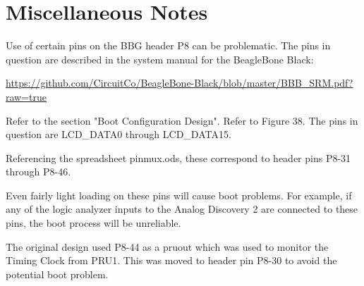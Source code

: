 \chapter{Miscellaneous Notes}

Use of certain pins on the BBG header P8 can be problematic.  The pins in question are described in the system manual for the BeagleBone Black:

\url{https://github.com/CircuitCo/BeagleBone-Black/blob/master/BBB_SRM.pdf?raw=true}

Refer to the section "Boot Configuration Design".  Refer to Figure 38.  The pins in question are LCD\_DATA0 through LCD\_DATA15.

Referencing the spreadsheet pinmux.ods, these correspond to header pins P8-31 through P8-46.

Even fairly light loading on these pins will cause boot problems.  For example, if any of the logic analyzer inputs to the Analog Discovery 2 are connected to these pins, the boot process will be unreliable.

The original design used P8-44 as a pruout which was used to monitor the Timing Clock from PRU1.  This was moved to header pin P8-30 to avoid the potential boot problem.